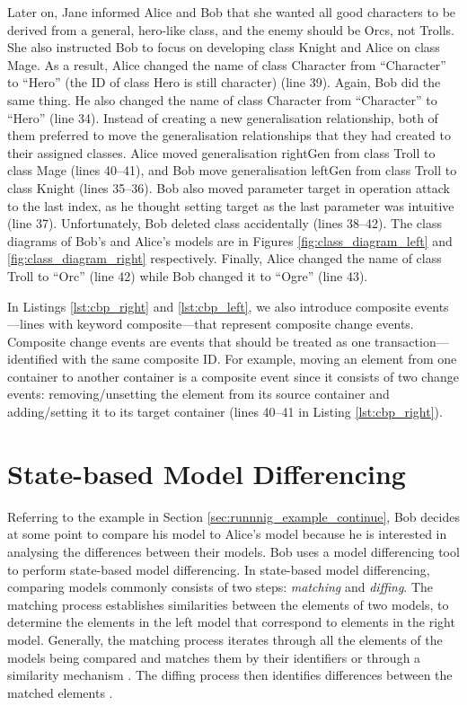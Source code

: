 Later on, Jane informed Alice and Bob that she wanted all good characters to be derived from a general, hero-like class, and the enemy should be Orcs, not Trolls. She also instructed Bob to focus on developing class \textsf{Knight} and Alice on class \textsf{Mage}. As a result, Alice changed the name of class \textsf{Character} from “Character” to “Hero” (the ID of class \textsf{Hero} is still \textsf{character}) (line 39). Again, Bob did the same thing. He also changed the name of class \textsf{Character} from “Character” to “Hero” (line 34). Instead of creating a new generalisation relationship, both of them preferred to move the generalisation relationships that they had created to their assigned classes. Alice moved generalisation \textsf{rightGen} from class \textsf{Troll} to class \textsf{Mage} (lines 40–41), and Bob move generalisation \textsf{leftGen} from class \textsf{Troll} to class \textsf{Knight} (lines 35–36). Bob also moved parameter \textsf{target} in operation \textsf{attack} to the last index, as he thought setting target as the last parameter was intuitive (line 37). Unfortunately, Bob deleted class  accidentally (lines 38–42). The class diagrams of Bob’s and Alice's models are in Figures \ref{fig:class_diagram_left} and \ref{fig:class_diagram_right} respectively. Finally, Alice changed the \textsf{name} of class \textsf{Troll} to “Orc” (line 42) while Bob changed it to “Ogre” (line 43).

In Listings \ref{lst:cbp_right} and \ref{lst:cbp_left}, we also introduce composite events—lines with keyword \textsf{composite}—that represent composite change events.
Composite change events are events that should be treated as one transaction—identified with the same composite ID.
For example, moving an element from one container to another container is a composite event since it consists of two change events:
removing/unsetting the element from its source container and adding/setting it to its target container (lines 40–41 in Listing \ref{lst:cbp_right}).

\section{State-based Model Differencing}
\label{sec:state-based_model_differencing}

Referring to the example in Section \ref{sec:runnnig_example_continue}, Bob decides at some point to compare his model to Alice’s model because he is interested in analysing the differences between their models. Bob uses a model differencing tool to perform state-based model differencing.
In state-based model differencing, comparing models commonly consists of two steps: \emph{matching} and \emph{diffing}.
The matching process establishes similarities between the elements of two models, to determine the elements in the left model that correspond to elements in the right model. Generally, the matching process iterates through all the elements of the models being compared and matches them by their identifiers or through a similarity mechanism \cite{DBLP:conf/sfm/BroschKLSWW12,emfcompare2018developer}. The diffing process then identifies differences between the matched elements \cite{DBLP:conf/sfm/BroschKLSWW12,emfcompare2018developer}.

